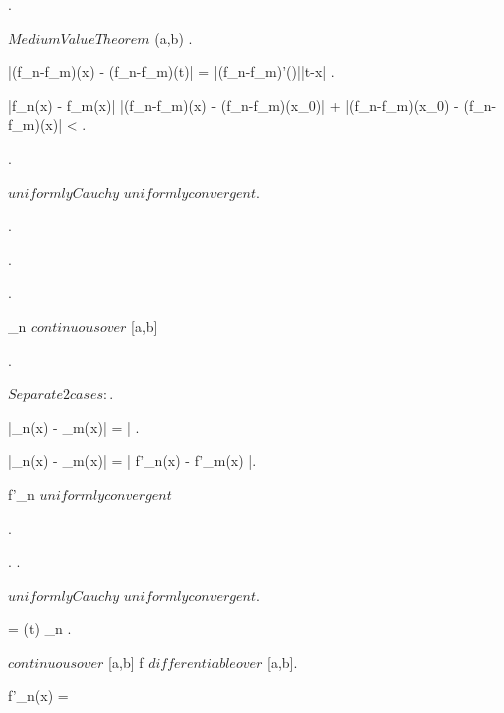 {{{{{				.

				$Medium Value Theorem$ \imp \exists \zeta \in (a,b) \suchthat .

				|(f_n-f_m)(x) - (f_n-f_m)(t)| = |(f_n-f_m)'(\zeta)||t-x| \leq {} .

				|f_n(x) - f_m(x)| \leq |(f_n-f_m)(x) - (f_n-f_m)(x_0)| + |(f_n-f_m)(x_0) - (f_n-f_m)(x)| < \eps.

				
			}.

			 \subset \R $ uniformly Cauchy $ \imp $ uniformly convergent $.


		}.
		
		{
			.

			.

			{
				\phi_n $ continuous over $ [a,b]
			}
		}.

		{
			$ Separate 2 cases: $.
			
			{
				|\phi_n(x) - \phi_m(x)| = |  \leq {}
			}.
			{
				|\phi_n(x) - \phi_m(x)| = | f'_n(x) - f'_m(x) |.

				f'_n $ uniformly convergent $ \imp \leq {}
			}.

			\all{ \eps \in \R^+ }
			{
				.
			}.

			 \subset \R $ uniformly Cauchy $ \imp $ uniformly convergent $.

			 = \phi(t) \imp \phi_n \convergesuniformlyto \phi.

			\phi $ continuous over $ [a,b] \imp f $ differentiable over $ [a,b].

			f'_n(x) = 
		}
	}}



}
